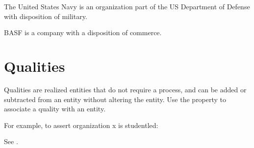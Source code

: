 \documentclass[letterpaper,10pt,english]{sphinxmanual}
\begin{document}
\begin{sphinxShadowBox}

\sphinxAtStartPar
The United States Navy is an organization part of the US Department of Defense
with disposition of military.
\end{sphinxShadowBox}

\begin{sphinxShadowBox}

\sphinxAtStartPar
BASF is a company with a disposition of commerce.
\end{sphinxShadowBox}


\section{Qualities}
\label{\detokenize{organizations:qualities}}
\sphinxAtStartPar
Qualities are realized entities that do not require a process, and can be added or
subtracted from an entity without altering the entity.  Use the {\hyperref[\detokenize{doc-RO_0000086::doc}]{}} property to associate a quality with an entity.

\sphinxAtStartPar
For example, to assert organization x is student\sphinxhyphen{}led:

\begin{sphinxVerbatim}[commandchars=\\\{\}]
  
  
\end{sphinxVerbatim}

\sphinxAtStartPar
See {\hyperref[\detokenize{organizations:table-3}]{}}.
\end{document}
